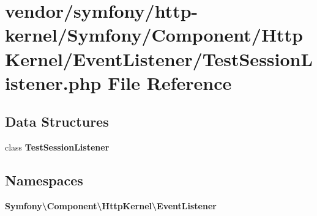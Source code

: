 \section{vendor/symfony/http-\/kernel/\+Symfony/\+Component/\+Http\+Kernel/\+Event\+Listener/\+Test\+Session\+Listener.php File Reference}
\label{_test_session_listener_8php}
\subsection*{Data Structures}
\begin{DoxyCompactItemize}
\item 
class {\bf Test\+Session\+Listener}
\end{DoxyCompactItemize}
\subsection*{Namespaces}
\begin{DoxyCompactItemize}
\item 
 {\bf Symfony\textbackslash{}\+Component\textbackslash{}\+Http\+Kernel\textbackslash{}\+Event\+Listener}
\end{DoxyCompactItemize}
